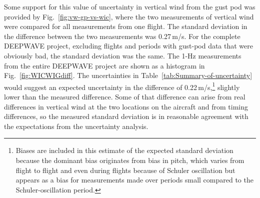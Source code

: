 \documentclass[12pt,twoside,english]{article}\usepackage[]{graphicx}\usepackage[]{color}
\let\OrgIndex\index
\renewcommand*{\index}[1]{\OrgIndex{#1}}
\begin{document}
{{Some support for this value of uncertainty in vertical wind from the gust pod was provided by Fig.~\ref{fig:vw-gp-vs-wic}, where the two measurements of vertical wind were compared for all measurements from one flight. The standard deviation in the difference between the two measurements was 0.27\,m/s. For the complete DEEPWAVE project, excluding flights and periods with gust-pod data that were obviously bad, the standard deviation was the same. The 1-Hz measurements from the entire DEEPWAVE project are shown as a histogram in Fig.~\ref{fig:WICWIGdiff}. The uncertainties in Table~\ref{tab:Summary-of-uncertainty} would suggest an expected uncertainty in the difference of 0.22\,m/s,\footnote{Biases are included in this estimate of the expected standard deviation because the dominant bias originates from bias in pitch, which varies from flight to flight and even during flights because of Schuler oscillation but appears as a bias for measurements made over periods small compared to the Schuler-oscillation period.} slightly lower than the measured difference. Some of that difference can arise from real differences in vertical wind at the two locations on the aircraft and from timing differences, so the measured standard deviation is in reasonable agreement with the expectations from the uncertainty analysis. 











}}
\end{document}
